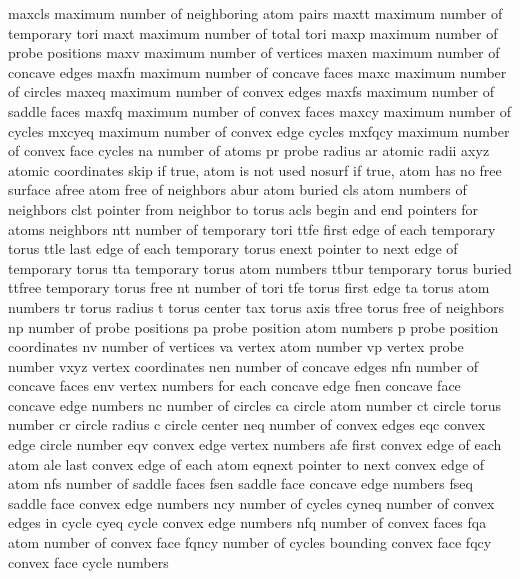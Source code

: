 \documentclass[letterpaper,11pt,english]{sphinxmanual}
\begin{document}
\begin{sphinxVerbatim}[commandchars=\\\{\}]
maxcls          maximum number of neighboring atom pairs
maxtt           maximum number of temporary tori
maxt            maximum number of total tori
maxp            maximum number of probe positions
maxv            maximum number of vertices
maxen           maximum number of concave edges
maxfn           maximum number of concave faces
maxc            maximum number of circles
maxeq           maximum number of convex edges
maxfs           maximum number of saddle faces
maxfq           maximum number of convex faces
maxcy           maximum number of cycles
mxcyeq          maximum number of convex edge cycles
mxfqcy          maximum number of convex face cycles
na              number of atoms
pr              probe radius
ar              atomic radii
axyz            atomic coordinates
skip            if true, atom is not used
nosurf          if true, atom has no free surface
afree           atom free of neighbors
abur            atom buried
cls             atom numbers of neighbors
clst            pointer from neighbor to torus
acls            begin and end pointers for atoms neighbors
ntt             number of temporary tori
ttfe            first edge of each temporary torus
ttle            last edge of each temporary torus
enext           pointer to next edge of temporary torus
tta             temporary torus atom numbers
ttbur           temporary torus buried
ttfree          temporary torus free
nt              number of tori
tfe             torus first edge
ta              torus atom numbers
tr              torus radius
t               torus center
tax             torus axis
tfree           torus free of neighbors
np              number of probe positions
pa              probe position atom numbers
p               probe position coordinates
nv              number of vertices
va              vertex atom number
vp              vertex probe number
vxyz            vertex coordinates
nen             number of concave edges
nfn             number of concave faces
env             vertex numbers for each concave edge
fnen            concave face concave edge numbers
nc              number of circles
ca              circle atom number
ct              circle torus number
cr              circle radius
c               circle center
neq             number of convex edges
eqc             convex edge circle number
eqv             convex edge vertex numbers
afe             first convex edge of each atom
ale             last convex edge of each atom
eqnext          pointer to next convex edge of atom
nfs             number of saddle faces
fsen            saddle face concave edge numbers
fseq            saddle face convex edge numbers
ncy             number of cycles
cyneq           number of convex edges in cycle
cyeq            cycle convex edge numbers
nfq             number of convex faces
fqa             atom number of convex face
fqncy           number of cycles bounding convex face
fqcy            convex face cycle numbers
\end{sphinxVerbatim}
\end{document}

